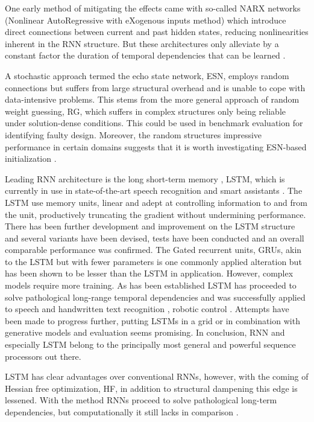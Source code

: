 One early method of mitigating the effects came with so-called NARX networks (Nonlinear AutoRegressive with eXogenous inputs method) \cite{DRNNS} which introduce direct connections between current and past hidden states, reducing nonlinearities inherent in the RNN structure. But these architectures only alleviate by a constant factor the duration of temporal dependencies that can be learned \cite{suts}.

A stochastic approach termed the echo state network, ESN, employs random connections but suffers from large structural overhead and is unable to cope with data-intensive problems. This stems from the more general approach of random weight guessing, RG, which suffers in complex structures only being reliable under solution-dense conditions. This could be used in benchmark evaluation for identifying faulty design. Moreover, the random structures impressive performance in certain domains suggests that it is worth investigating ESN-based initialization \cite{suts}. 

Leading RNN architecture is the long short-term memory \cite{LSTM}, LSTM, which is currently in use in state-of-the-art speech recognition and smart assistants \cite{Apple}. The LSTM use memory units, linear and adept at controlling information to and from the unit, productively truncating the gradient without undermining performance. There has been further development and improvement on the LSTM structure and several variants have been devised, tests have been conducted and an overall comparable performance was confirmed\cite{Greff}. The Gated recurrent units, GRUs, akin to the LSTM but with fewer parameters is one commonly applied alteration but has been shown to be lesser than the LSTM in application. However, complex models require more training. As has been established LSTM has proceeded to solve pathological long-range temporal dependencies and was successfully applied to speech and handwritten text recognition \cite{gs, gas}, robotic control \cite{mayer}. Attempts have been made to progress further, putting LSTMs in a grid\cite{ka} or in combination with generative models and evaluation seems promising\cite{gr, ch, bo}. In conclusion, RNN and especially LSTM belong to the principally most general and powerful sequence processors out there.

LSTM has clear advantages over conventional RNNs, however, with the coming of Hessian free optimization, HF, in addition to structural dampening this edge is lessened. With the method RNNs proceed to solve pathological long-term dependencies, but computationally it still lacks in comparison \cite{suts}. 

